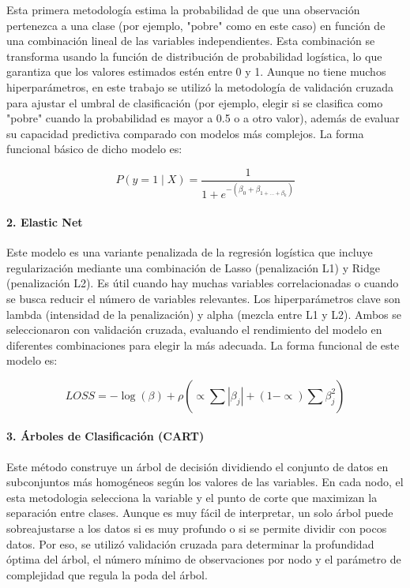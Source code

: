 \documentclass[12pt,a4paper,onecolumn]{article}
\begin{document}
Esta primera metodología estima la probabilidad de que una observación pertenezca a una clase (por ejemplo, "pobre" como en este caso) en función de una combinación lineal de las variables independientes. Esta combinación se transforma usando la función de distribución de probabilidad logística, lo que garantiza que los valores estimados estén entre 0 y 1. Aunque no tiene muchos hiperparámetros, en este trabajo se utilizó la metodología de validación cruzada para ajustar el umbral de clasificación (por ejemplo, elegir si se clasifica como "pobre" cuando la probabilidad es mayor a 0.5 o a otro valor), además de evaluar su capacidad predictiva comparado con modelos más complejos. La forma funcional básico de dicho modelo es:

$$P\left( y = 1 \middle| X \right) = \frac{1}{1 + e^{- (\beta_{0} + \beta_{1 + \ldots + \beta_{k}})}}$$

\paragraph{2. Elastic Net}

Este modelo es una variante penalizada de la regresión logística que incluye regularización mediante una combinación de Lasso (penalización L1) y Ridge (penalización L2). Es útil cuando hay muchas variables correlacionadas o cuando se busca reducir el número de variables relevantes. Los hiperparámetros clave son lambda (intensidad de la penalización) y alpha (mezcla entre L1 y L2). Ambos se seleccionaron con validación cruzada, evaluando el rendimiento del modelo en diferentes combinaciones para elegir la más adecuada. La forma funcional de este modelo es:

$$LOSS = - \log(\beta) + \rho( \propto \sum_{}^{}\left| \beta_{j} \right| + (1 - \propto )\sum_{}^{}\beta_{j}^{2})$$

\paragraph{3. Árboles de Clasificación (CART)}

Este método construye un árbol de decisión dividiendo el conjunto de datos en subconjuntos más homogéneos según los valores de las variables. En cada nodo, el esta metodologia selecciona la variable y el punto de corte que maximizan la separación entre clases. Aunque es muy fácil de interpretar, un solo árbol puede sobreajustarse a los datos si es muy profundo o si se permite dividir con pocos datos. Por eso, se utilizó validación cruzada para determinar la profundidad óptima del árbol, el número mínimo de observaciones por nodo y el parámetro de complejidad que regula la poda del árbol.
\end{document}
